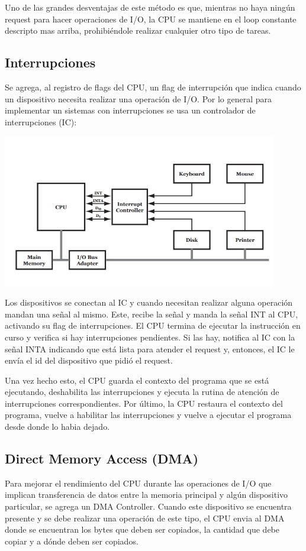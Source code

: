 Uno de las grandes desventajas de este método es que, mientras no haya ningún request para hacer operaciones de I/O, la CPU se mantiene en el loop constante descripto mas arriba, prohibiéndole realizar cualquier otro tipo de tareas.

\subsection{Interrupciones}
Se agrega, al registro de flags del CPU, un flag de interrupción que indica cuando un dispositivo necesita realizar una operación de I/O. Por lo general para implementar un sistemas con interrupciones se usa un controlador de interrupciones (IC):

\begin{center}
	\includegraphics[width=12cm, keepaspectratio=yes]{imagenes/iointerruptio.png}
\end{center}

Los dispositivos se conectan al IC y cuando necesitan realizar alguna operación mandan una señal al mismo. Este, recibe la señal y manda la señal INT al CPU, activando su flag de interrupciones. El CPU termina de ejecutar la instrucción en curso y verifica si hay interrupciones pendientes. Si las hay, notifica al IC con la señal INTA indicando que está lista para atender el request y, entonces, el IC le envía el id del dispositivo que pidió el request.

Una vez hecho esto, el CPU guarda el contexto del programa que se está ejecutando, deshabilita las interrupciones y ejecuta la rutina de atención de interrupciones correspondientes. Por último, la CPU restaura el contexto del programa, vuelve a habilitar las interrupciones y vuelve a ejecutar el programa desde donde lo habia dejado.

\subsection{Direct Memory Access (DMA)}
Para mejorar el rendimiento del CPU durante las operaciones de I/O que implican transferencia de datos entre la memoria principal y algún dispositivo particular, se agrega un DMA Controller. Cuando este dispositivo se encuentra presente y se debe realizar una operación de este tipo, el CPU envia al DMA donde se encuentran los bytes que deben ser copiados, la cantidad que debe copiar y a dónde deben ser copiados.

